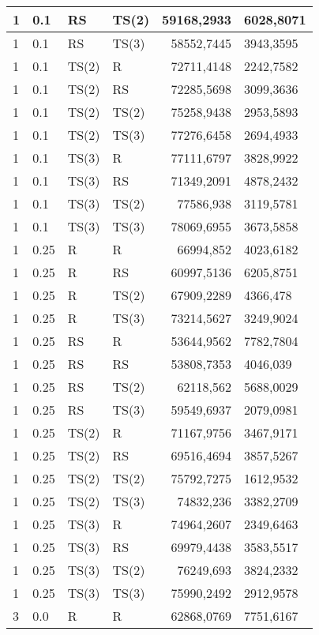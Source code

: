 \documentclass[twoside]{iisthesis}
\begin{document}
\begin{center}
\begin{longtable}{|l|l|l|l|r@{$\pm$}l|}
		1 & 0.1 & RS & TS(2) & 59168,2933 & 6028,8071\\ \hline
		1 & 0.1 & RS & TS(3) & 58552,7445 & 3943,3595\\ \hline
		1 & 0.1 & TS(2) & R & 72711,4148 & 2242,7582\\ \hline
		1 & 0.1 & TS(2) & RS & 72285,5698 & 3099,3636\\ \hline
		1 & 0.1 & TS(2) & TS(2) & 75258,9438 & 2953,5893\\ \hline
		1 & 0.1 & TS(2) & TS(3) & 77276,6458 & 2694,4933\\ \hline
		1 & 0.1 & TS(3) & R & 77111,6797 & 3828,9922\\ \hline
		1 & 0.1 & TS(3) & RS & 71349,2091 & 4878,2432\\ \hline
		1 & 0.1 & TS(3) & TS(2) & 77586,938 & 3119,5781\\ \hline
		1 & 0.1 & TS(3) & TS(3) & 78069,6955 & 3673,5858\\ \hline
		1 & 0.25 & R & R & 66994,852 & 4023,6182\\ \hline
		1 & 0.25 & R & RS & 60997,5136 & 6205,8751\\ \hline
		1 & 0.25 & R & TS(2) & 67909,2289 & 4366,478\\ \hline
		1 & 0.25 & R & TS(3) & 73214,5627 & 3249,9024\\ \hline
		1 & 0.25 & RS & R & 53644,9562 & 7782,7804\\ \hline
		1 & 0.25 & RS & RS & 53808,7353 & 4046,039\\ \hline
		1 & 0.25 & RS & TS(2) & 62118,562 & 5688,0029\\ \hline
		1 & 0.25 & RS & TS(3) & 59549,6937 & 2079,0981\\ \hline
		1 & 0.25 & TS(2) & R & 71167,9756 & 3467,9171\\ \hline
		1 & 0.25 & TS(2) & RS & 69516,4694 & 3857,5267\\ \hline
		1 & 0.25 & TS(2) & TS(2) & 75792,7275 & 1612,9532\\ \hline
		1 & 0.25 & TS(2) & TS(3) & 74832,236 & 3382,2709\\ \hline
		1 & 0.25 & TS(3) & R & 74964,2607 & 2349,6463\\ \hline
		1 & 0.25 & TS(3) & RS & 69979,4438 & 3583,5517\\ \hline
		1 & 0.25 & TS(3) & TS(2) & 76249,693 & 3824,2332\\ \hline
		1 & 0.25 & TS(3) & TS(3) & 75990,2492 & 2912,9578\\ \hline
		3 & 0.0 & R & R & 62868,0769 & 7751,6167\\ \hline

\end{longtable}
\end{center}
\end{document}
